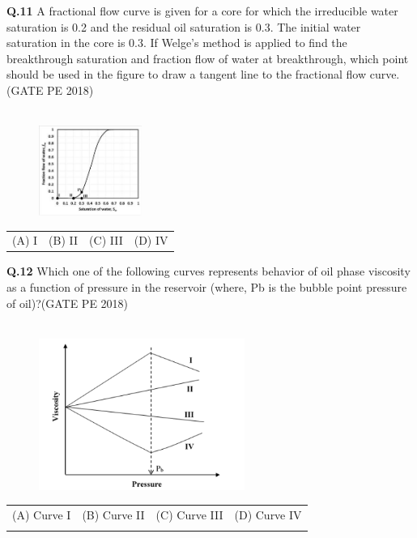 \documentclass[12pt,a4paper]{article}
\begin{document}
\noindent
\textbf{Q.11}\hspace{0.5em} A fractional flow curve is given for a core for which the irreducible water saturation is 0.2
and the residual oil saturation is 0.3. The initial water saturation in the core is 0.3. If
Welge’s method is applied to find the breakthrough saturation and fraction flow of water at
breakthrough, which point should be used in the figure to draw a tangent line to the
fractional flow curve.\hfill(GATE PE 2018)\\\\

\begin{figure}[h!]
  \centering
  \includegraphics[width=0.3\textwidth]{pic6.png} 
\end{figure}

\begin{center}
\begin{tabular}{llll}
(A) I & (B) II & (C) III & (D) IV
\end{tabular}
\end{center}

\pagebreak

\noindent
\textbf{Q.12} \hspace{0.5em} Which one of the following curves represents behavior of oil phase viscosity as a function
of pressure in the reservoir (where, Pb is the bubble point pressure of oil)?\hfill(GATE PE 2018)\\\\

\begin{figure}[h!]
  \centering
  \includegraphics[width=0.6\textwidth]{pic7.png} 
\end{figure}
\begin{center}
\begin{tabular}{llll}
	(A) Curve I  & (B) Curve II & (C) Curve III & (D) Curve IV\\\\
\end{tabular}
\end{center}
\end{document}
